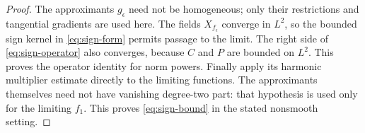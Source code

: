 \begin{proof}
The approximants $g_\epsilon$ need not be homogeneous; only their
restrictions and tangential gradients are used here.  The fields
$X_{f_\epsilon}$ converge in $L^2$, so the bounded sign kernel in
\eqref{eq:sign-form} permits passage to the limit.  The right side of
\eqref{eq:sign-operator} also converges, because $C$ and $P$ are
bounded on $L^2$.  This proves the operator identity for norm powers.
Finally apply its harmonic multiplier estimate directly to the
limiting functions.  The approximants themselves need not have
vanishing degree-two part: that hypothesis is used only for the
limiting $f_1$.  This proves \eqref{eq:sign-bound} in the stated
nonsmooth setting.
\end{proof}
